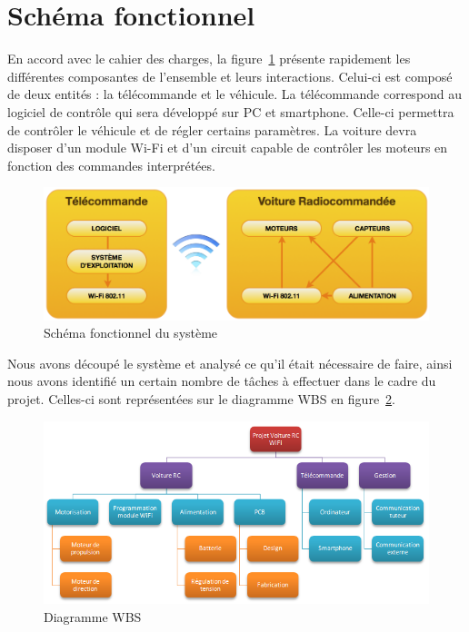 \documentclass[a4paper,12pt]{report}
\begin{document}
	\section{Schéma fonctionnel}
	En accord avec le cahier des charges, la figure~\ref{schemafonctionnel} présente rapidement les différentes composantes de l’ensemble et leurs interactions. Celui-ci est composé de deux entités : la télécommande et le véhicule.
La télécommande correspond au logiciel de contrôle qui sera développé sur PC et smartphone. Celle-ci permettra de contrôler le véhicule et de régler certains paramètres.
La voiture devra disposer d’un module Wi-Fi et d’un circuit capable de contrôler les moteurs en fonction des commandes interprétées.

\begin{figure}%
	\begin{center}
		\includegraphics[scale=0.75]{images/schemafonctionnel.png}
	\end{center}
	\caption{Schéma fonctionnel du système} 
	\label{schemafonctionnel}
\end{figure}

	Nous avons découpé le système et analysé ce qu’il était nécessaire de faire, ainsi nous avons identifié un certain nombre de tâches à effectuer dans le cadre du projet. Celles-ci sont représentées sur le diagramme WBS en figure~\ref{wbs}.
	
	\begin{figure}%
	\begin{center}
		\includegraphics[scale=1.1]{images/wbs.png}
	\end{center}
	\caption{Diagramme WBS} 
	\label{wbs}
	\end{figure}
	
\end{document}
